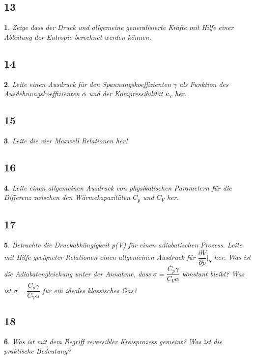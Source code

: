 \documentclass[12pt,a4paper]{report}
\newtheorem{myfrag}{}%
\begin{document}
\subsection{13}
\begin{myfrag}
Zeige dass der Druck und allgemeine generalisierte Kräfte mit Hilfe einer
Ableitung der Entropie berechnet werden können.
\end{myfrag}
\subsection{14}
\begin{myfrag}
Leite einen Ausdruck für den Spannungskoeffizienten $\gamma$ als Funktion des
Ausdehnungskoeffizienten $\alpha$ und der Kompressibilität $\kappa_T$ her.
\end{myfrag}
\subsection{15}
\begin{myfrag}
Leite die vier Maxwell Relationen her!
\end{myfrag}
\subsection{16}
\begin{myfrag}
Leite einen allgemeinen Ausdruck von physikalischen Parametern für die
Differenz zwischen den Wärmekapazitäten $C_p$ und $C_V$ her.
\end{myfrag}
\subsection{17}
\begin{myfrag}
Betrachte die Druckabhängigkeit p(V) für einen adiabatischen Prozess. Leite mit
Hilfe geeigneter Relationen einen allgemeinen Ausdruck für $\dfrac{\partial V}{\partial p}|_S$ her. Was ist die
Adiabatengleichung unter der Annahme, dass $\sigma = \dfrac{C_p\gamma}{C_V\alpha}$ konstant bleibt? Was ist $\sigma = \dfrac{C_p\gamma}{C_V\alpha}$ für ein ideales klassisches Gas?
\end{myfrag}
\subsection{18}
\begin{myfrag}
Was ist mit dem Begriff reversibler Kreisprozess gemeint? Was ist die praktische
Bedeutung?
\end{myfrag}
\end{document}
